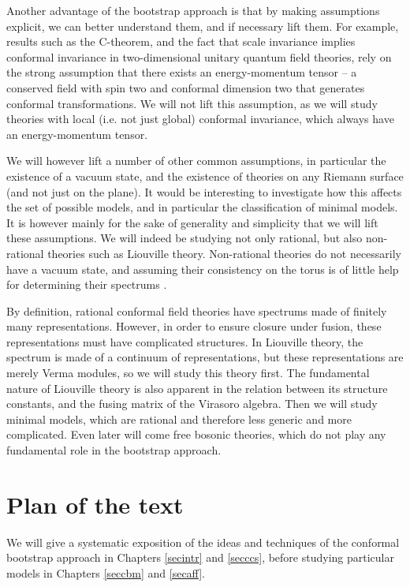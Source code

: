 \documentclass[12pt, a4paper, notitlepage, twoside]{report}
\numberwithin{equation}{section}
\theoremstyle{break}
\begin{document}
Another advantage of the bootstrap approach is that by making assumptions explicit, we can better understand them, and if necessary lift them.
For example, results such as the C-theorem, and the fact that scale invariance implies conformal invariance in two-dimensional unitary quantum field theories, rely on the strong assumption that there exists an energy-momentum tensor -- a conserved field with spin two and conformal dimension two that generates conformal transformations.
We will not lift this assumption, as we will study theories with local (i.e.
not just global) conformal invariance, which always have an energy-momentum tensor.

We will however lift a number of other common assumptions, in particular the existence of a vacuum state, and the existence of theories on any Riemann surface (and not just on the plane).
It would be interesting to investigate how this affects the set of possible models, and in particular the classification of minimal models.
It is however mainly for the sake of generality and simplicity that
we will lift these assumptions.
We will indeed be studying not only rational, but also non-rational theories such as Liouville theory.
Non-rational theories do not necessarily have a vacuum state, and assuming their consistency on the torus is of little help for determining their spectrums \cite{rib14c}. 

By definition, rational conformal field theories have spectrums made of finitely many representations.
However, in order to ensure closure under fusion, these representations must have complicated structures.
In Liouville theory, the spectrum is made of a continuum of representations, but these representations are merely Verma modules, so we will study this theory first. The fundamental nature of Liouville theory is also apparent in the relation between its structure constants, and the fusing matrix of the Virasoro algebra.
Then we will study minimal models, which are rational and therefore less generic and more complicated.
Even later will come free bosonic theories, which do not play any fundamental role in the bootstrap approach.


\section{Plan of the text \label{secplan}}

We will give a systematic exposition of the ideas and techniques of the conformal bootstrap approach in Chapters \ref{secintr} and \ref{secccs}, before studying particular models in Chapters \ref{seccbm} and \ref{secaff}.
\end{document}
